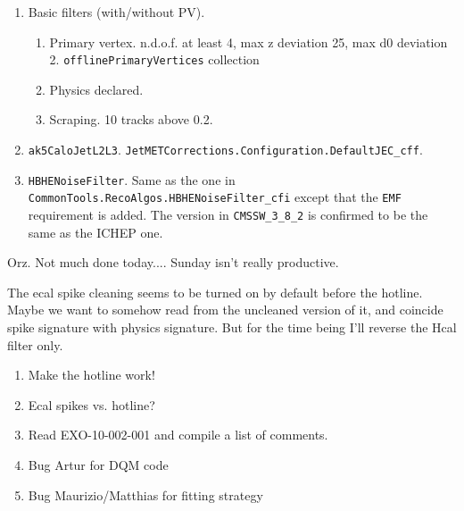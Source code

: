 
\begin{enumerate}
\item Basic filters (with/without PV).
   \begin{enumerate}
   \item Primary vertex.  n.d.o.f. at least 4, max z deviation 25, max d0 deviation 2.
      \texttt{offlinePrimaryVertices} collection
   \item Physics declared.
   \item Scraping.  10 tracks above 0.2.
   \end{enumerate}
\item \texttt{ak5CaloJetL2L3}.  \texttt{JetMETCorrections.Configuration.DefaultJEC\_cff}.
\item \texttt{HBHENoiseFilter}.  Same as the one in \texttt{CommonTools.RecoAlgos.HBHENoiseFilter\_cfi}
except that the \texttt{EMF} requirement is added.  The version in \texttt{CMSSW\_3\_8\_2} is confirmed
to be the same as the ICHEP one.
\end{enumerate}


Orz.  Not much done today....  Sunday isn't really productive.

The ecal spike cleaning seems to be turned on by default before the hotline.  Maybe we want to somehow read from
the uncleaned version of it, and coincide spike signature with physics signature.  But for the time being I'll reverse
the Hcal filter only.



\begin{enumerate}
\item Make the hotline work!
\item Ecal spikes vs. hotline?
\item Read EXO-10-002-001 and compile a list of comments.
\item Bug Artur for DQM code
\item Bug Maurizio/Matthias for fitting strategy
\end{enumerate}



